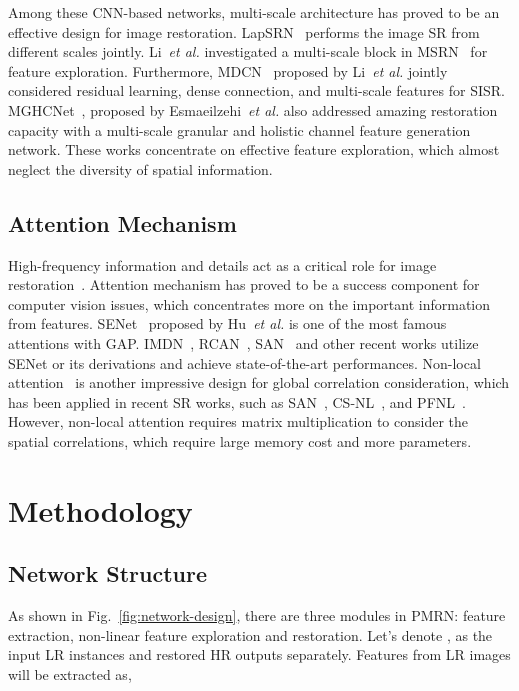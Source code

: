 \documentclass[journal]{IEEEtran}
\begin{document}
Among these CNN-based networks, multi-scale architecture has proved to be an effective design for image restoration. LapSRN~\cite{lapsrn, ms-lapsrn} performs the image SR from different scales jointly. Li~\textit{et al.} investigated a multi-scale block in MSRN~\cite{msrn} for feature exploration. Furthermore, MDCN~\cite{mdcn} proposed by Li~\textit{et al.} jointly considered residual learning, dense connection, and multi-scale features for SISR. MGHCNet~\cite{mghcnet}, proposed by Esmaeilzehi~\textit{et al.} also addressed amazing restoration capacity with a multi-scale granular and holistic channel feature generation network. These works concentrate on effective feature exploration, which almost neglect the diversity of spatial information.

\subsection{Attention Mechanism}
High-frequency information and details act as a critical role for image restoration~\cite{review2_6}. Attention mechanism has proved to be a success component for computer vision issues, which concentrates more on the important information from features. SENet~\cite{senet_hu2018} proposed by Hu~\textit{et al.} is one of the most famous attentions with GAP. IMDN~\cite{imdn_hui2019}, RCAN~\cite{rcan}, SAN~\cite{san_dai2019} and other recent works utilize SENet or its derivations and achieve state-of-the-art performances. Non-local attention~\cite{nonlocal2018wang} is another impressive design for global correlation consideration, which has been applied in recent SR works, such as SAN~\cite{san_dai2019}, CS-NL~\cite{csnl}, and PFNL~\cite{pfnl}. However, non-local attention requires matrix multiplication to consider the spatial correlations, which require large memory cost and more parameters.


\section{Methodology}
\subsection{Network Structure}
As shown in Fig.~\ref{fig:network-design}, there are three modules in PMRN: feature extraction, non-linear feature exploration and restoration. 
Let's denote ,  as the input LR instances and restored HR outputs separately. Features from LR images will be extracted as,
\end{document}
